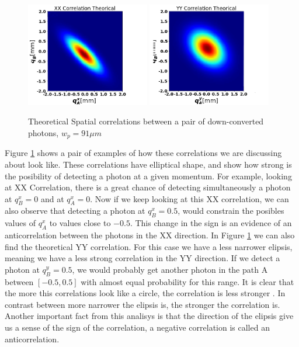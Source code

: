 \begin{figure}[h!]
\centering
{  \includegraphics[width=0.48\textwidth]{Figures/theoricalxx.png} }
{  \includegraphics[width=0.48\textwidth]{Figures/theoricalyy.png} }
\caption{Theoretical Spatial correlations between a pair of down-converted photons, $w_p=91\mu m$}
 \label{fig:correThe}
\end{figure}
Figure \ref{fig:correThe} shows a pair of examples of how these correlations we are discussing about look like. These correlations have elliptical shape,
and show how strong is the posibility of detecting a photon at a given momentum. For example, looking 
at XX Correlation, there is a great chance
of detecting simultaneously a photon at $q^x_B=0$ and at $q^x_A=0$. Now if we keep looking at this XX correlation, we can also 
observe that detecting a photon at $q^x_B=0.5$, would constrain the posibles values of $q^x_A$ to values close to $-0.5$. This change in the sign
is an evidence of an anticorrelation between the photons in the XX direction. In Figure \ref{fig:correThe} we can also find the theoretical YY correlation. For this case we have a less narrower elipsis, meaning 
we have a less strong correlation in the YY direction. If we detect a photon at $q^y_B=0.5$, we would probably get 
another photon in the path A between $[-0.5,0.5]$ with almost equal probability for this range. It is clear that the more this correlations 
look like a circle, the correlation is less stronger . In contrast between more narrower the elipsis is, the stronger the correlation is. 
Another important fact from this analisys is that the direction of the elipsis give us a sense of the sign of the correlation, a negative correlation
is called an anticorrelation.



